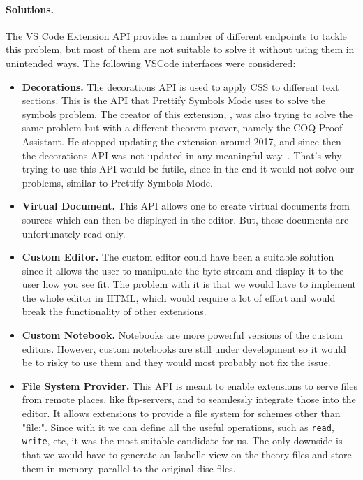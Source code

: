 \paragraph{Solutions.}
The VS Code Extension API provides a number of different endpoints to tackle this problem, but most of them are not suitable to solve it without using them in unintended ways. The following VSCode interfaces were considered:
\begin{itemize}
  \item \textbf{Decorations.} The decorations API is used to apply CSS to different text sections. This is the API that Prettify Symbols Mode uses to solve the symbols problem. The creator of this extension, \citeauthor{psm_issue}, was also trying to solve the same problem but with a different theorem prover, namely the COQ Proof Assistant. He stopped updating the extension around 2017, and since then the decorations API was not updated in any meaningful way~\parencite{psm_issue}. That's why trying to use this API would be futile, since in the end it would not solve our problems, similar to Prettify Symbols Mode. 
  \item \textbf{Virtual Document.} This API allows one to create virtual documents from sources which can then be displayed in the editor. But, these documents are unfortunately read only.
  \item \textbf{Custom Editor.} The custom editor could have been a suitable solution since it allows the user to manipulate the byte stream and display it to the user how you see fit. The problem with it is that we would have to implement the whole editor in HTML, which would require a lot of effort and would break the functionality of other extensions.
  \item \textbf{Custom Notebook.} Notebooks are more powerful versions of the custom editors. However, custom notebooks are still under development so it would be to risky to use them and they would most probably not fix the issue. 
  \item \textbf{File System Provider.} This API is meant to enable extensions to serve files from remote places, like ftp-servers, and to seamlessly integrate those into the editor. It allows extensions to provide a file system for schemes other than "file:". Since with it we can define all the useful operations, such as \texttt{read}, \texttt{write}, etc, it was the most suitable candidate for us. The only downside is that we would have to generate an Isabelle view on the theory files and store them in memory, parallel to the original disc files.
\end{itemize}


